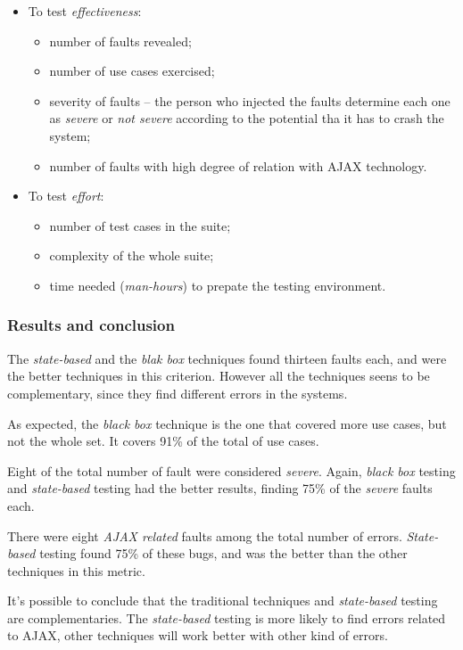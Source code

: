 \documentclass[a4paper, twocolumn]{ieee}
\begin{document}
\begin{itemize}

\item To test \emph{effectiveness}:
\begin{itemize}
\item number of faults revealed;
\item number of use cases exercised;
\item severity of faults -- the person who injected the faults determine each one as \emph{severe} or \emph{not severe} according to the potential tha it has to crash the system;
\item number of faults with high degree of relation with AJAX technology.
\end{itemize}

\item To test \emph{effort}:
\begin{itemize}
\item number of test cases in the suite;
\item complexity of the whole suite;
\item time needed (\emph{man-hours}) to prepate the testing environment.
\end{itemize}

\end{itemize} 

\subsubsection{Results and conclusion}

The \emph{state-based} and the \emph{blak box} techniques found thirteen faults each, and were the better techniques in this criterion.
However all the techniques seens to be complementary, since they find different errors in the systems.

As expected, the \emph{black box} technique is the one that covered more use cases, but not the whole set.
It covers 91\% of the total of use cases.

Eight of the total number of fault were considered \emph{severe}. Again, \emph{black box} testing and \emph{state-based} testing had the better results, finding 75\% of the \emph{severe} faults each.

There were eight \emph{AJAX related} faults among the total number of errors. 
\emph{State-based} testing found 75\% of these bugs, and was the better than the other techniques in this metric.

It's possible to conclude that the traditional techniques and \emph{state-based} testing are complementaries.
The \emph{state-based} testing is more likely to find errors related to AJAX, other techniques will work better with other kind of errors.
\end{document}
